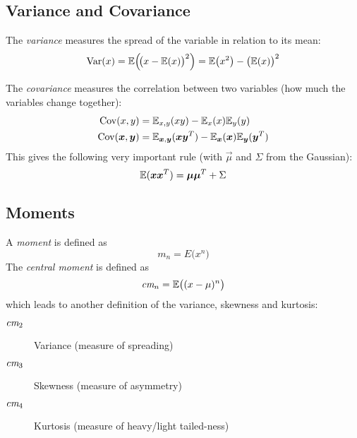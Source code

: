 		\subsection{Variance and Covariance}
			The \emph{variance} measures the spread of the variable in relation to its mean:
			\begin{equation}
				\operatorname{Var}(x) = \mathbb{E}\Big(\!\big( x - \mathbb{E}(x) \big)^2 \Big) = \mathbb{E}\big(x^2\big) - \big(\mathbb{E}(x)\big)^2
			\end{equation}

			The \emph{covariance} measures the correlation between two variables (how much the variables change together):
			\begin{align}
				\operatorname{Cov}(x, y)             & = \mathbb{E}_{x,y}(xy) - \mathbb{E}_x(x) \mathbb{E}_y(y)                                                         \\
				\operatorname{Cov}(\bm{x}, \bm{y}) & = \mathbb{E}_{\bm{x},\bm{y}}(\bm{x}\bm{y}^T) - \mathbb{E}_{\bm{x}}(\bm{x}) \mathbb{E}_{\bm{y}}(\bm{y}^T)
			\end{align}
			This gives the following very important rule (with \(\vec{\mu}\) and \(\Sigma\) from the Gaussian):
			\begin{equation}
				\mathbb{E}(\bm{x}\bm{x}^T) = \bm{\mu}\bm{\mu}^T + \Sigma
			\end{equation}

		\subsection{Moments}
			A \emph{moment} is defined as
			\begin{equation}
				m_n = E\big(x^n\big)
			\end{equation}
			The \emph{central moment} is defined as
			\begin{equation}
				\textit{cm}_n = \mathbb{E}\big( (x - \mu)^n \big)
			\end{equation}
			which leads to another definition of the variance, skewness and kurtosis:
			\begin{description}
				\item[\( \textit{\textrm{cm}}_2 \)] Variance (measure of spreading)
				\item[\( \textit{\textrm{cm}}_3 \)] Skewness (measure of asymmetry)
				\item[\( \textit{\textrm{cm}}_4 \)] Kurtosis (measure of heavy/light tailed-ness)
			\end{description}

